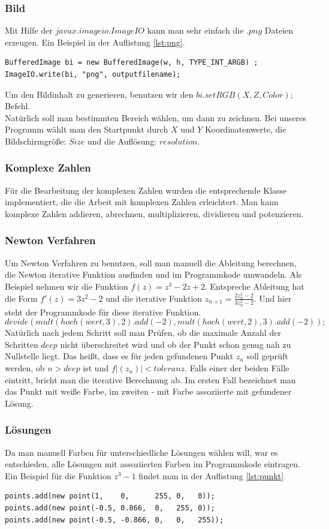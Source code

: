 \documentclass[a4paper,12pt]{llncs}
\numberwithin{equation}{section}
\begin{document}
\subsubsection{Bild}
Mit Hilfe der $javax$.$imageio$.$ImageIO$ kann man sehr einfach die .$png$ Dateien erzeugen. Ein Beispiel in der Auflistung \ref{lst:png}.
\begin{lstlisting}[caption=Ein Beispiel für PNG Generierung, label=lst:png]
BufferedImage bi = new BufferedImage(w, h, TYPE_INT_ARGB) ;
ImageIO.write(bi, "png", outputfilename);
\end{lstlisting}
Um den Bildinhalt zu generieren, benutzen wir den $bi.setRGB(X, Z, Color);$ Befehl.\\
Natürlich soll man bestimmten Bereich wählen, um dann zu zeichnen. 
Bei unseres Programm wählt man den Startpunkt durch $X$ und $Y$ Koordinatenwerte, die Bildschirmgröße: $Size$ und die Auflösung: $resolution$. 
\subsubsection{Komplexe Zahlen}
Für die Bearbeitung der komplexen Zahlen wurden die entsprechende Klasse implementiert, die die Arbeit mit komplexen Zahlen erleichtert. 
Man kann komplexe Zahlen addieren, abrechnen, multiplizieren, dividieren und potenzieren.
\subsubsection{Newton Verfahren}
Um Newton Verfahren zu benutzen, soll man manuell die Ableitung berechnen, die Newton iterative Funktion ausfinden und im Programmkode umwandeln.
Als Beispiel nehmen wir die Funktion $f(z) = z^3 - 2z + 2$.
Entspreche Ableitung hat die Form $f'(z) = 3z^2 - 2$ und die iterative Funktion $z_{n+1} = \frac{2z_n^3 - 2}{3z_n^2 - 2}$.
Und hier steht der Programmkode für diese iterative Funktion.
\[
	devide(mult(hoch(wert,3),2).add(-2), mult(hoch(wert,2),3).add(-2));
\]
Natürlich nach jedem Schritt soll man Prüfen, ob die maximale Anzahl der Schritten $deep$ nicht überschreitet wird und ob der Punkt schon genug nah zu Nullstelle liegt. 
Das heißt, dass es für jeden gefundenen Punkt $z_n$ soll geprüft werden, ob $n > deep$ ist und $f|(z_n)| < toleranz$.
Falls einer der beiden Fälle eintritt, bricht man die iterative Berechnung ab.
Im ersten Fall bezeichnet man das Punkt mit weiße Farbe, im zweiten - mit Farbe assoziierte mit gefundener Lösung. 
\subsubsection{Lösungen} 
Da man manuell Farben für unterschiedliche Lösungen wählen will, war es entschieden, alle Lösungen mit assoziierten Farben im Programmkode eintragen. 
Ein Beispiel für die Funktion $z^3 - 1$ findet man in der Auflistung \ref{lst:punkt}
\begin{lstlisting}[caption=Lösungen mit Farben für $z^3 - 1$, label=lst:punkt]
points.add(new point(1,	   0,	   255, 0,   0));
points.add(new point(-0.5, 0.866,  0,   255, 0));
points.add(new point(-0.5, -0.866, 0,   0,   255));
\end{lstlisting}
\end{document}
